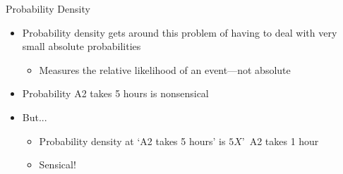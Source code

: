 \documentclass[aspectratio=169]{beamer}
\begin{document}
\begin{frame}{Probability Density}

\begin{itemize}
\item Probability density gets around this problem of having to deal with very small absolute probabilities
	\begin{itemize}
	\item Measures the relative likelihood of an event---not absolute
	\end{itemize}
\item Probability A2 takes 5 hours is nonsensical
\item But...
	\begin{itemize}
	\item Probability density at  `A2 takes 5 hours' is $5X$'\ A2 takes 1 hour
	\item Sensical!
	\end{itemize}
\end{itemize}
\end{frame}
\end{document}
